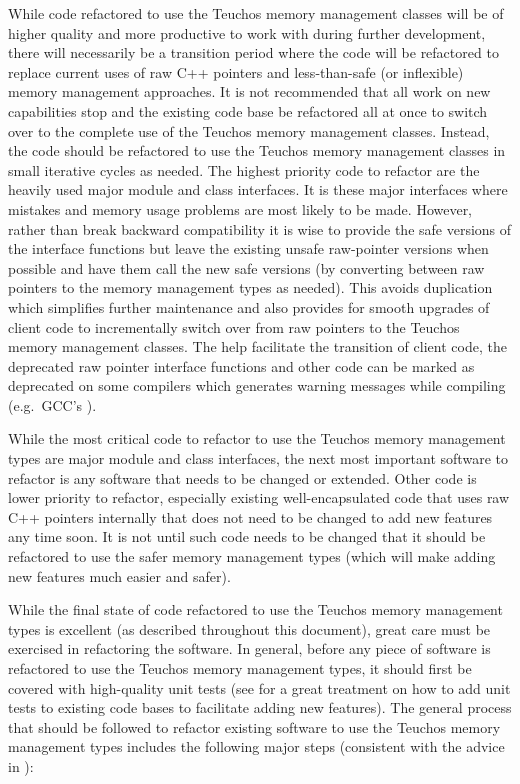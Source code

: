 \documentclass[pdf,ps2pdf,11pt]{SANDreport}
\begin{document}
While code refactored to use the Teuchos memory management classes
will be of higher quality and more productive to work with during
further development, there will necessarily be a transition period
where the code will be refactored to replace current uses of raw C++
pointers and less-than-safe (or inflexible) memory management
approaches.  It is not recommended that all work on new capabilities
stop and the existing code base be refactored all at once to switch
over to the complete use of the Teuchos memory management classes.
Instead, the code should be refactored to use the Teuchos memory
management classes in small iterative cycles as needed.  The highest
priority code to refactor are the heavily used major module and class
interfaces.  It is these major interfaces where mistakes and memory
usage problems are most likely to be made.  However, rather than break
backward compatibility it is wise to provide the safe versions of the
interface functions but leave the existing unsafe raw-pointer versions
when possible and have them call the new safe versions (by converting
between raw pointers to the memory management types as needed).  This
avoids duplication which simplifies further maintenance and also
provides for smooth upgrades of client code to incrementally switch
over from raw pointers to the Teuchos memory management classes.  The
help facilitate the transition of client code, the deprecated raw
pointer interface functions and other code can be marked as deprecated
on some compilers which generates warning messages while compiling
(e.g.\ GCC's {}).

While the most critical code to refactor to use the Teuchos memory
management types are major module and class interfaces, the next most
important software to refactor is any software that needs to be
changed or extended.  Other code is lower priority to refactor,
especially existing well-encapsulated code that uses raw C++ pointers
internally that does not need to be changed to add new features any
time soon.  It is not until such code needs to be changed that it
should be refactored to use the safer memory management types (which
will make adding new features much easier and safer).

While the final state of code refactored to use the Teuchos memory
management types is excellent (as described throughout this document),
great care must be exercised in refactoring the software.  In general,
before any piece of software is refactored to use the Teuchos memory
management types, it should first be covered with high-quality unit
tests (see {}\cite{WorkingEffectivelyWithLegacyCode05} for a great
treatment on how to add unit tests to existing code bases to
facilitate adding new features).  The general process that should be
followed to refactor existing software to use the Teuchos memory
management types includes the following major steps (consistent with
the advice in {}\cite{WorkingEffectivelyWithLegacyCode05}):
\end{document}
